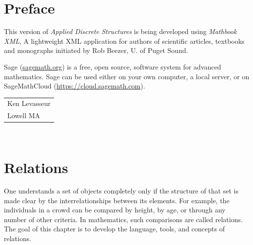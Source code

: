 \documentclass[10pt,]{book}
\theoremstyle{plain}
\theoremstyle{definition}
\theoremstyle{definition}
\theoremstyle{definition}
\theoremstyle{definition}
\begin{document}
\chapter*{Preface}\label{preface-1}
This version of \emph{Applied Discrete Structures} is being developed using \emph{Mathbook XML}, A lightweight XML application for authors of scientific articles, textbooks and monographs initiated by Rob Beezer, U. of Puget Sound.  %
\par
Sage (\href{http://sagemath.org}{sagemath.org}) is a free, open source, software system for advanced mathematics.  Sage can be used either on your own computer, a local server, or on SageMathCloud (\href{https://cloud.sagemath.com}{https://cloud.sagemath.com}). %
\par\hfill\begin{tabular}{l@{}}
Ken Levasseur\\
Lowell MA
\end{tabular}\\\par
\setcounter{tocdepth}{1}
\renewcommand*\contentsname{Contents}
\tableofcontents
\mainmatter
\typeout{************************************************}
\typeout{************************************************}
\chapter[Relations]{Relations}\label{chapter_6}
\typeout{************************************************}
\typeout{************************************************}
One understands a set of objects completely only if the structure of that set is made clear by the interrelationships between its elements. For example, the individuals in a crowd can be compared by height, by age, or through any number of other criteria. In mathematics, such comparisons are called relations. The goal of this chapter is to develop the language, tools, and concepts of relations.%
\typeout{************************************************}
\typeout{************************************************}
\end{document}

